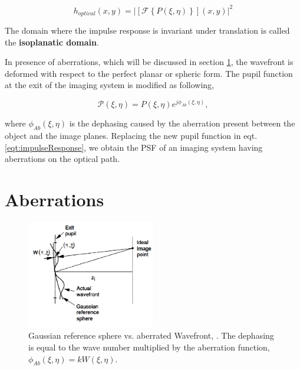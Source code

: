 \begin{equation}
h_{optical}(x,y) = |\left[\mathcal{F}\left\lbrace P(\xi,\eta) \right\rbrace\right](x,y)|^2
\label{eqt:impulseResponse}
\end{equation}

The domain where the impulse response is invariant under translation is called the \textbf{isoplanatic domain}.

In presence of aberrations, which will be discussed in section \ref{sec:Aberrations}, the wavefront is deformed with respect to the perfect planar or spheric form. The pupil function at the exit of the imaging system is modified as following,

\begin{equation}
\mathcal{P}(\xi,\eta) = P(\xi,\eta) e^{j\phi_{Ab}(\xi,\eta)},
\label{eqt:aberratedPhasor}
\end{equation}

where $\phi_{Ab}(\xi,\eta)$ is the dephasing caused by the aberration present between the object and the image planes. Replacing the new pupil function in eqt. \eqref{eqt:impulseResponse}, we obtain the PSF of an imaging system having aberrations on the optical path.

\section{Aberrations}
\label{sec:Aberrations}

\begin{figure}
\centering
\includegraphics[width=0.5\textwidth]{Figures/AbWFvsGausSphWF}
\decoRulewrapFig
\caption[Gaussian reference sphere vs. aberrated Wavefront]{Gaussian reference sphere vs. aberrated Wavefront, \citep[Chapter 6.4]{goodman_1968}. The dephasing is equal to the wave number multiplied by the aberration function, $\phi_{Ab}(\xi,\eta) = k W(\xi,\eta)$.}
\label{fig:AbWFvsGausSphWF}
\end{figure}

